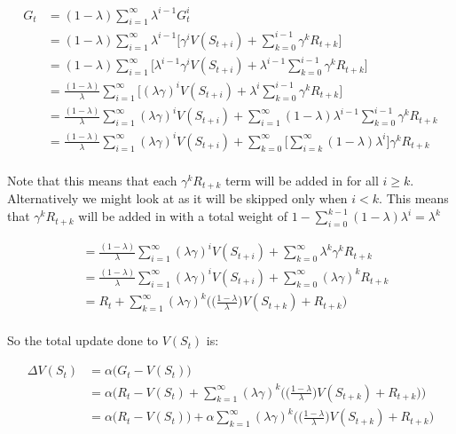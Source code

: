\documentclass[11pt]{article}
\begin{document}
\begin{align*}
G_t &= (1-\lambda) \sum_{i=1}^{\infty} \lambda^{i-1}G^i_t \\
&= (1-\lambda) \sum_{i=1}^{\infty} \lambda^{i-1} \big[ \gamma^i V(S_{t+i}) + \sum_{k=0}^{i - 1} \gamma^k R_{t+k} \big] \\
&= (1-\lambda) \sum_{i=1}^{\infty} \big[ \lambda^{i-1} \gamma^i V(S_{t+i}) + \lambda^{i-1}\sum_{k=0}^{i - 1} \gamma^k R_{t+k} \big] \\
&= \frac{(1-\lambda)}{\lambda} \sum_{i=1}^{\infty} \big[ (\lambda \gamma)^i V(S_{t+i}) + \lambda^{i}\sum_{k=0}^{i - 1} \gamma^k R_{t+k} \big] \\
&= \frac{(1-\lambda)}{\lambda} \sum_{i=1}^{\infty} (\lambda \gamma)^i V(S_{t+i}) + \sum_{i=1}^{\infty} (1 - \lambda) \lambda^{i - 1}\sum_{k=0}^{i - 1} \gamma^k R_{t+k} \\
&= \frac{(1-\lambda)}{\lambda} \sum_{i=1}^{\infty} (\lambda \gamma)^i V(S_{t+i}) + \sum_{k=0}^\infty \big[ \sum_{i=k}^\infty (1 - \lambda)\lambda^i \big]\gamma^k R_{t+k} \\
\end{align*}

Note that this means that each $\gamma^k R_{t+k}$ term will be added in for all $i \geq k$.
Alternatively we might look at as it will be skipped only when $i < k$.
This means that $\gamma^k R_{t+k}$ will be added in with a total weight of $1 - \sum_{i=0}^{k - 1} (1 - \lambda) \lambda^{i} = \lambda^k$

\begin{align*}
&= \frac{(1-\lambda)}{\lambda} \sum_{i=1}^{\infty} (\lambda \gamma)^i V(S_{t+i}) + \sum_{k=0}^\infty \lambda^k \gamma^k R_{t+k} \\
&= \frac{(1-\lambda)}{\lambda} \sum_{i=1}^{\infty} (\lambda \gamma)^i V(S_{t+i}) + \sum_{k=0}^\infty (\lambda \gamma)^k R_{t+k} \\
&= R_t + \sum_{k=1}^{\infty} (\lambda \gamma)^k \bigg(\big(\frac{1 - \lambda}{\lambda}\big)V(S_{t+k}) + R_{t+k} \bigg) \\
\end{align*}

So the total update done to $V(S_t)$ is:

\begin{align*}
\Delta V(S_t) &= \alpha\big(G_t - V(S_t)\big) \\
&= \alpha\Big(R_t - V(S_t) + \sum_{k=1}^{\infty} (\lambda \gamma)^k \bigg(\big(\frac{1 - \lambda}{\lambda}\big)V(S_{t+k}) + R_{t+k} \bigg) \Big) \\
&= \alpha\big(R_t - V(S_t) \big) + \alpha \sum_{k=1}^{\infty} (\lambda \gamma)^k \bigg(\big(\frac{1 - \lambda}{\lambda}\big)V(S_{t+k}) + R_{t+k} \bigg)  \\
\end{align*}
\end{document}
